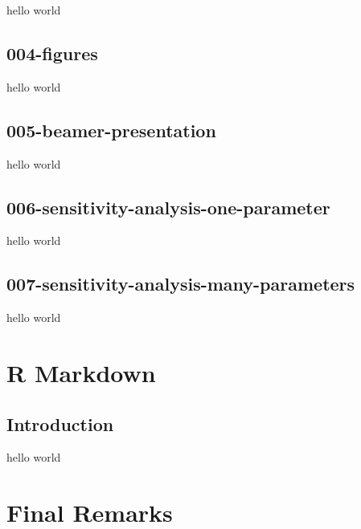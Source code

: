 \documentclass[10pt]{beamer}\usepackage[]{graphicx}\usepackage[]{color}
\begin{document}
\begin{frame}
hello world
\end{frame}


\subsection{004-figures}

\begin{frame}
hello world
\end{frame}


\subsection{005-beamer-presentation}

\begin{frame}
hello world
\end{frame}


\subsection{006-sensitivity-analysis-one-parameter}

\begin{frame}
hello world
\end{frame}

\subsection{007-sensitivity-analysis-many-parameters}

\begin{frame}
hello world
\end{frame}




\section{R Markdown}


\subsection{Introduction}

\begin{frame}
hello world
\end{frame}


\section{Final Remarks}
\end{document}
